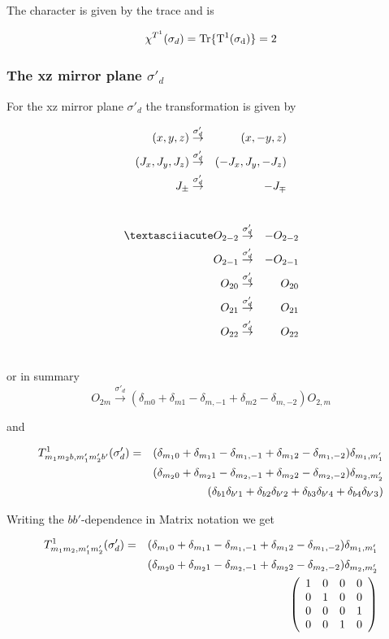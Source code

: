 The character is given by the trace and is 

\begin{equation}
\chi^{T^1}(\sigma_d)=\rm Tr \{ T^1(\sigma_d) \}=2
\end{equation}


\subsubsection{The xz mirror plane  $\sigma'_d$}

For the xz mirror plane $\sigma'_d$ the transformation is given by

\begin{eqnarray}
(x,y,z) &\stackrel{\sigma'_d}{\rightarrow}& (x,-y,z) \\ \nonumber
(J_x,J_y,J_z) &\stackrel{\sigma'_d}{\rightarrow}&  (-J_x,J_y,-J_z) \\ \nonumber
J_\pm &\stackrel{\sigma'_d}{\rightarrow}& - J_\mp \\ \nonumber
\end{eqnarray}

\begin{eqnarray}
´O_{2-2}&\stackrel{\sigma'_d}{\rightarrow}&-O_{2-2} \nn
O_{2-1}&\stackrel{\sigma'_d}{\rightarrow}&-O_{2-1} \nn
O_{20}&\stackrel{\sigma'_d}{\rightarrow}&O_{20} \nn
O_{21}&\stackrel{\sigma'_d}{\rightarrow}&O_{21}\nn
O_{22}&\stackrel{\sigma'_d}{\rightarrow}&O_{22}\nn
\end{eqnarray}

or in summary
\begin{equation}
O_{2m}\stackrel{\sigma'_d}{\rightarrow} (\delta_{m0}+\delta_{m1}-\delta_{m,-1}+\delta_{m2}-\delta_{m,-2}) O_{2,m} 
\end{equation}

and 

\begin{eqnarray}
T^1_{m_1m_2b,m'_1m'_2b'}(\sigma'_d)&=&(\delta_{m_10}+\delta_{m_11}-\delta_{m_1,-1}+\delta_{m_12}-\delta_{m_1,-2})
\delta_{m_1,m'_1}\\ \nonumber
&&(\delta_{m_20}+\delta_{m_21}-\delta_{m_2,-1}+\delta_{m_22}-\delta_{m_2,-2})
\delta_{m_2,m'_2}\\ \nonumber
&&(\delta_{b1}\delta_{b'1}+\delta_{b2}\delta_{b'2}+\delta_{b3}\delta_{b'4}+\delta_{b4}\delta_{b'3})
\end{eqnarray}

Writing the $bb'$-dependence in Matrix notation we get

\begin{eqnarray}\label{sdd}
T^1_{m_1m_2,m'_1m'_2}(\sigma'_d)&=&(\delta_{m_10}+\delta_{m_11}-\delta_{m_1,-1}+\delta_{m_12}-\delta_{m_1,-2})
\delta_{m_1,m'_1}\\ \nonumber
&&(\delta_{m_20}+\delta_{m_21}-\delta_{m_2,-1}+\delta_{m_22}-\delta_{m_2,-2})
\delta_{m_2,m'_2}\\ \nonumber
&&\left (
\begin{array}{cccc}
1 & 0 & 0 & 0 \\
0 & 1 & 0 & 0 \\
0 & 0 & 0 & 1 \\
0 & 0 & 1 & 0 
\end{array} \right )
\end{eqnarray}

